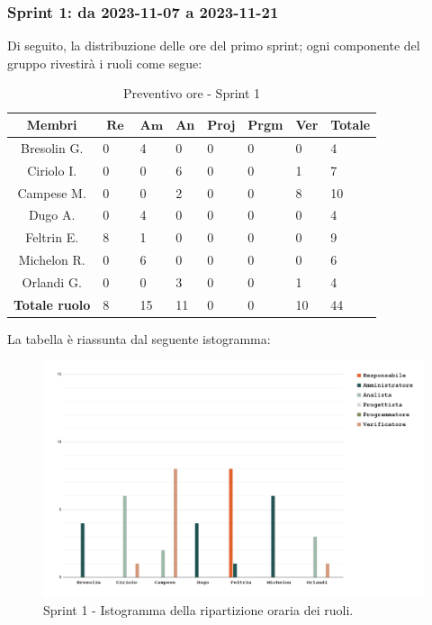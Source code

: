 \documentclass[10pt, a4paper]{article}
\begin{document}
{{{{{{{{\subsubsection{Sprint 1: da 2023-11-07 a 2023-11-21}
Di seguito, la distribuzione delle ore del primo sprint; ogni componente del gruppo rivestirà i ruoli come segue:
\begin{table}[H]
\begin{tabularx}{\textwidth}{c|X|X|X|X|X|X|X}
        \textbf{Membri} & $\operatorname{\textbf{Re}}$ & $\mathrm{\textbf{Am}}$ & \textbf{An} & \textbf{Proj} & \textbf{Prgm} & \textbf{Ver} & \textbf{Totale} \\
        \hline Bresolin G. & 0 & \cellcolor{primarycolor}4 & 0 & 0 & 0 & 0 & 4 \\
        \hline Ciriolo I.  & 0 & 0 & \cellcolor{primarycolor}6 & 0 & 0 & 1 & 7 \\
        \hline Campese M.  & 0 & 0 & 2 & 0 & 0 & \cellcolor{primarycolor}8 & 10 \\
        \hline Dugo A.     & 0 & \cellcolor{primarycolor}4 & 0 & 0 & 0 & 0 & 4 \\
        \hline Feltrin E.  & \cellcolor{primarycolor}8 & 1 & 0 & 0 & 0 & 0 & 9 \\
        \hline Michelon R. & 0 & \cellcolor{primarycolor}6 & 0 & 0 & 0 & 0 & 6 \\
        \hline Orlandi G.  & 0 & 0 & \cellcolor{primarycolor}3 & 0 & 0 & 1 & 4 \\
        \hline
        \textbf{Totale ruolo} & 8 & 15 & 11 & 0 & 0 & 10 & 44 
    \end{tabularx}
    \caption{Preventivo ore - Sprint 1}
    \end{table}

La tabella è riassunta dal seguente istogramma:
 \begin{figure}[H]
        \centering        
        \includegraphics[width=15.5cm]{istogrammi/istogramma_1_periodo.png}
        \caption{Sprint 1 - Istogramma della ripartizione oraria dei ruoli. }
    \end{figure}
 
}}}}}}}}
\end{document}
